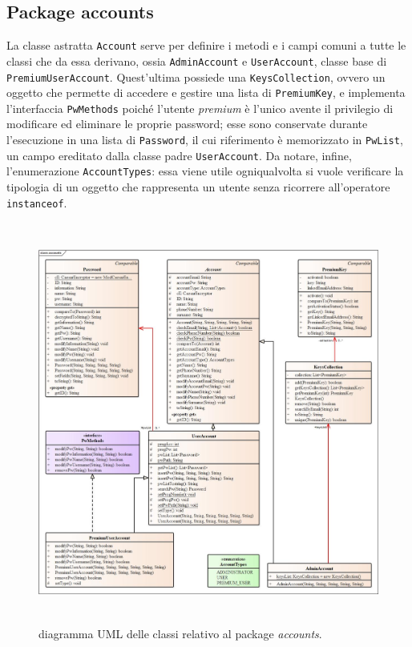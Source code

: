 \documentclass[a4paper, 12pt, one column, aas_macros]{article}
\begin{document}
	\subsection{Package accounts}
	La classe astratta \verb|Account| serve per definire i metodi e i campi comuni a tutte le classi che da essa derivano, ossia \verb|AdminAccount| e \verb|UserAccount|, classe base di \verb|PremiumUserAccount|. Quest'ultima possiede una \verb|KeysCollection|, ovvero un oggetto che permette di accedere e gestire una lista di \verb|PremiumKey|, e implementa l'interfaccia \verb|PwMethods| poiché l'utente \textit{premium} è l'unico avente il privilegio di modificare ed eliminare le proprie password; esse sono conservate durante l'esecuzione in una lista di \verb|Password|, il cui riferimento è memorizzato in \verb|PwList|, un campo ereditato dalla classe padre \verb|UserAccount|. Da notare, infine, l'enumerazione \verb|AccountTypes|: essa viene utile ogniqualvolta si vuole verificare la tipologia di un oggetto che rappresenta un utente senza ricorrere all'operatore \verb|instanceof|.
	\begin{figure}[h!]
		\centering
		\includegraphics[height=500px]{UML/accounts.jpg}
		\caption{diagramma UML delle classi relativo al package \textit{accounts}.}
		\label{UML_accounts}
	\end{figure}
	
\end{document}
